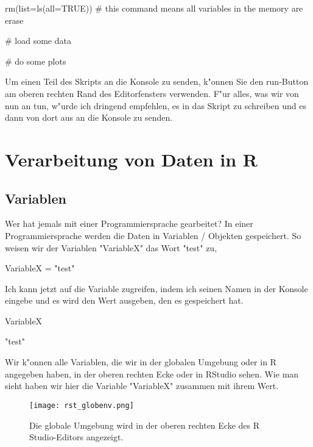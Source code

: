 \documentclass[a4paper,twoside]{tufte-book}\usepackage[]{graphicx}\usepackage[]{color}
\begin{document}
\begin{appendices}
\begin{Schunk}
\begin{Sinput}
rm(list=ls(all=TRUE))  # this command means all variables in the memory are erase

# load some data

# do some plots
\end{Sinput}
\end{Schunk}

Um einen Teil des Skripts an die Konsole zu senden, k"onnen Sie den run-Button am oberen rechten Rand des Editorfensters verwenden. F"ur alles, was wir von nun an tun, w"urde ich dringend empfehlen, es in das Skript zu schreiben und es dann von dort aus an die Konsole zu senden.

\chapter{Verarbeitung von Daten in R}
\label{HandlingDataInR}

\section{Variablen}

Wer hat jemals mit einer Programmiersprache gearbeitet? In einer Programmiersprache werden die Daten in Variablen / Objekten gespeichert. So weisen wir der Variablen "VariableX" das Wort "test" zu,

\begin{Schunk}
\begin{Sinput}
VariableX = "test"
\end{Sinput}
\end{Schunk}

Ich kann jetzt auf die Variable zugreifen, indem ich seinen Namen in der Konsole eingebe und es wird den Wert ausgeben, den es gespeichert hat.
\begin{Schunk}
\begin{Sinput}
VariableX
\end{Sinput}
\begin{Soutput}
[1] "test"
\end{Soutput}
\end{Schunk}

Wir k"onnen alle Variablen, die wir in der globalen Umgebung oder in R angegeben haben, in der oberen rechten Ecke oder in RStudio sehen. Wie man sieht haben wir hier die Variable "VariableX" zusammen mit ihrem Wert.


\begin{figure}[]
\begin{center}
\texttt{[image: rst\_globenv.png]}
\caption{Die globale Umgebung wird in der oberen rechten Ecke des R Studio-Editors angezeigt.}
\label{fig: Rstudio}
\end{center}
\end{figure}


\end{appendices}
\end{document}
